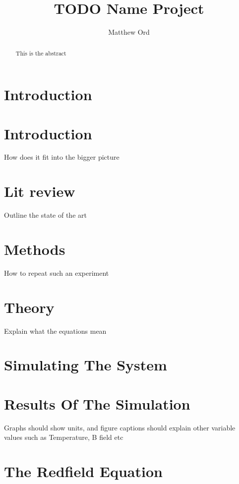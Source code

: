 \documentclass{article}
\title{TODO Name Project}
\author{Matthew Ord}
\date{}
\begin{document}
\maketitle

\begin{abstract}
    This is the abstract
\end{abstract}



\pagebreak
\section{Introduction}


\section{Introduction}
How does it fit into the bigger picture

\section{Lit review}
Outline the state of the art

\section{Methods}
How to repeat such an experiment

\section{Theory}
Explain what the equations mean


\section{Simulating The System}


\section{Results Of The Simulation}
Graphs should show units, and figure captions should explain other variable values such as Temperature, B
field etc

\section{The Redfield Equation}

\end{document}
